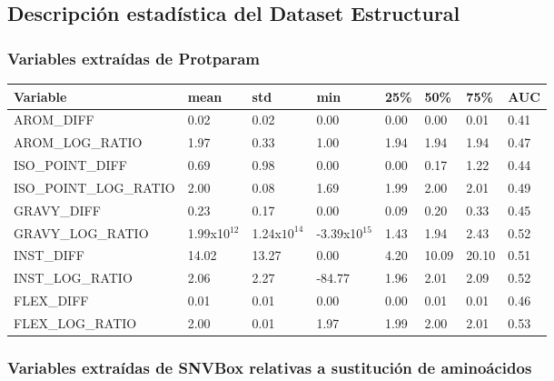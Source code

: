 \subsection{Descripción estadística del Dataset Estructural}

\subsubsection{Variables extraídas de Protparam}

\begin{table}[H]
\centering
\begin{tabular}{|l|l|l|l|l|l|l|l|}
\hline
Variable & mean & std & min & 25\% & 50\%  & 75\%  & AUC \\ \hline
AROM\_DIFF  & 0.02  & 0.02  & 0.00 & 0.00 & 0.00  & 0.01  & 0.41 \\ \hline
AROM\_LOG\_RATIO & 1.97 & 0.33 & 1.00 & 1.94 & 1.94  & 1.94  & 0.47 \\ \hline
ISO\_POINT\_DIFF & 0.69  & 0.98 & 0.00  & 0.00 & 0.17  & 1.22  & 0.44 \\ \hline
ISO\_POINT\_LOG\_RATIO & 2.00 & 0.08 & 1.69 & 1.99 & 2.00  & 2.01  & 0.49 \\ \hline
GRAVY\_DIFF & 0.23 & 0.17 & 0.00 & 0.09 & 0.20  & 0.33  & 0.45 \\ \hline
GRAVY\_LOG\_RATIO & 1.99x10$^{12}$ & 1.24x$10^{14}$ & -3.39x10$^{15}$ & 1.43 & 1.94 & 2.43 & 0.52 \\\hline
INST\_DIFF & 14.02 & 13.27 & 0.00 & 4.20 & 10.09 & 20.10 & 0.51 \\ \hline
INST\_LOG\_RATIO & 2.06 & 2.27 & -84.77 & 1.96 & 2.01  & 2.09  & 0.52 \\ \hline
FLEX\_DIFF & 0.01 & 0.01 & 0.00 & 0.00 & 0.01  & 0.01  & 0.46 \\ \hline
FLEX\_LOG\_RATIO & 2.00 & 0.01 & 1.97 & 1.99 & 2.00  & 2.01  & 0.53 \\ \hline
\end{tabular}
\end{table}


\subsubsection{Variables extraídas de SNVBox relativas a sustitución de aminoácidos}

